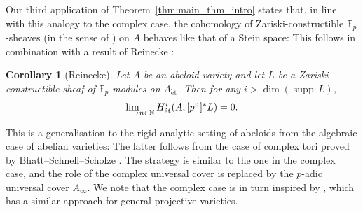 \documentclass[10pt,oneside]{amsart}
\newtheorem{corollary}[theorem]{Corollary}
\theoremstyle{definition}
\newtheorem{question}[theorem]{Question}
\newtheorem{example}[theorem]{Example}
\newcommand{\supp}{{\operatorname{supp}\,}}
\newcommand{\et}{\operatorname{\acute{e}t}}
\newcommand{\F}{\mathbb{F}}
\begin{document}
Our third application of Theorem~\ref{thm:main_thm_intro} states that, in line with this analogy to the complex case, the cohomology of Zariski-constructible $\F_p$-sheaves (in the sense of \cite[before \S3.1]{Reinecke}) on $A$ behaves like that of a Stein space: This follows in combination with a result of Reinecke \cite[Theorem 3.3]{Reinecke}:
\begin{corollary}[Reinecke]
	Let $A$ be an abeloid variety and let $L$ be a Zariski-constructible sheaf of $\mathbb F_p$-modules on $A_{\et}$. Then for any $i>\dim(\supp L)$,
	\[\textstyle\varinjlim_{n\in \mathbb N}H_{\et}^i(A,[p^n]^{\ast}L)=0.\]
\end{corollary}
	This is a generalisation to the rigid analytic setting of abeloids from the algebraic case of abelian varieties: The latter follows from the case of complex tori proved by Bhatt--Schnell--Scholze \cite[Corollary~1.2]{BSS_VanishingTheorems}. The strategy is similar to the one in the complex case, and the role of the complex universal cover is replaced by the $p$-adic universal cover $A_\infty$. We note that the complex case is in turn inspired by \cite[Theorem~17.3]{PerfectoidApplications}, which has a similar approach for general projective varieties.
 \begin{comment}
Now we end the introduction by describing the content of each section. 

	\begin{question} \label{question_intro}
	    \begin{enumerate} 
	    \item		Given a rigid group $G$, when is there an adic space $G_\infty$ such that $G_\infty \sim  \varprojlim_{[p]} G ?$
	    \item If it exists, and $K$ is perfectoid, when is $G_\infty$ perfectoid?
	    \end{enumerate}
	\end{question}
 
 
	But before we give proofs for examples of rigid groups $G$ for which a perfectoid tilde-limit exists, we first note that the second question certainly doesn't have an affirmative answer for all rigid group varieties:
	\begin{example}
		For the additive group $\mathbb G_a^{\operatorname{an}}$, we know that $[p]$ is an isomorphism and therefore $\varprojlim_{[p]} \mathbb G_a=\mathbb G_a$ exists (even as an actual limit in the category of adic spaces) but is certainly not perfectoid.
	\end{example}

\end{comment} 
 
\end{document}
